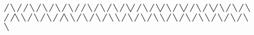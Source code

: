     ╱              ╲  ╱                    ╱      ╲     ╱          ╲  ╱                   ╲         ╱              ╲  ╱                    ╱      ╲     ╱          ╲  ╱                   ╲
   ╱                ╲╱                    ╱        ╲   ╱            ╲╱                     ╲       ╱                ╲╱                    ╱        ╲   ╱            ╲╱                     ╲
  ╱                  ╲                   ╱          ╲ ╱             ╱╲                      ╲     ╱                  ╲                   ╱          ╲ ╱             ╱╲                      ╲
 ╱                    ╲                 ╱            ╲             ╱  ╲                      ╲   ╱                    ╲                 ╱            ╲             ╱  ╲                      ╲
╱                      ╲               ╱              ╲           ╱    ╲                      ╲ ╱                      ╲               ╱              ╲           ╱    ╲                      ╲
